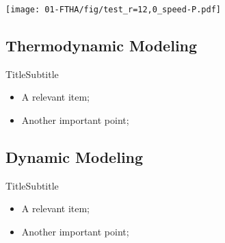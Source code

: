     \begin{frame}\vspace*{-2em}
        \begin{center}
            \noindent\hspace*{-4.5mm}%
            \texttt{[image: 01-FTHA/fig/test\_r=12,0\_speed-P.pdf]}
        \end{center}
    \end{frame}

\subsection{Thermodynamic Modeling}

    \begin{frame}{Title}{Subtitle}\vspace*{-2em}
        \begin{itemize}
            \item<2->  A \alert{relevant} item;
            \item<3->  Another \alert{important} point;
        \end{itemize}
    \end{frame}

\subsection{Dynamic Modeling}

    \begin{frame}{Title}{Subtitle}\vspace*{-2em}
        \begin{itemize}
            \item<2->  A \alert{relevant} item;
            \item<3->  Another \alert{important} point;
        \end{itemize}
    \end{frame}

